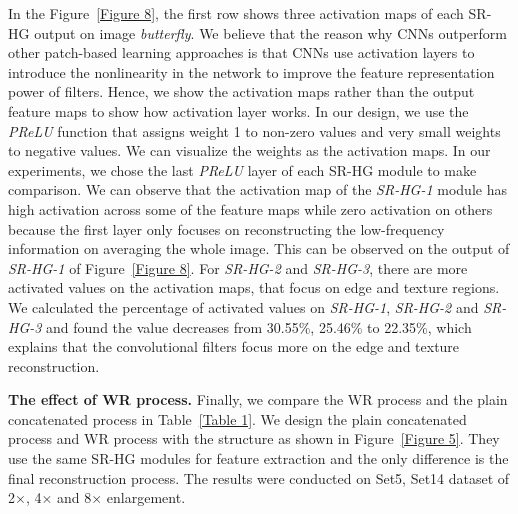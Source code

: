\documentclass[10pt,twocolumn,letterpaper]{article}
\begin{document}
In the Figure~\ref{Figure 8}, the first row shows three activation maps of each SR-HG output on image \textit{butterfly}. We believe that the reason why CNNs outperform other patch-based learning approaches is that CNNs use activation layers to introduce the nonlinearity in the network to improve the feature representation power of filters. Hence, we show the activation maps rather than the output feature maps to show how activation layer works. In our design, we use the \textit{PReLU} function that assigns weight 1 to non-zero values and very small weights to negative values. We can visualize the weights as the activation maps. In our experiments, we chose the last \textit{PReLU} layer of each SR-HG module to make comparison. We can observe that the activation map of the \textit{SR-HG-1} module has high activation across some of the feature maps while zero activation on others because the first layer only focuses on reconstructing the low-frequency information on averaging the whole image. This can be observed on the output of \textit{SR-HG-1} of Figure~\ref{Figure 8}. For \textit{SR-HG-2} and \textit{SR-HG-3}, there are more activated values on the activation maps, that focus on edge and texture regions. We calculated the percentage of activated values on \textit{SR-HG-1}, \textit{SR-HG-2} and \textit{SR-HG-3} and found the value decreases from 30.55\%, 25.46\% to 22.35\%, which explains that the convolutional filters focus more on the edge and texture reconstruction.

\textbf{The effect of WR process.}
Finally, we compare the WR process and the plain concatenated process in Table~\ref{Table 1}. We design the plain concatenated process and WR process with the structure as shown in Figure~\ref{Figure 5}. They use the same SR-HG modules for feature extraction and the only difference is the final reconstruction process. The results were conducted on Set5, Set14 dataset of 2$\times$, 4$\times$ and 8$\times$ enlargement.
\end{document}
